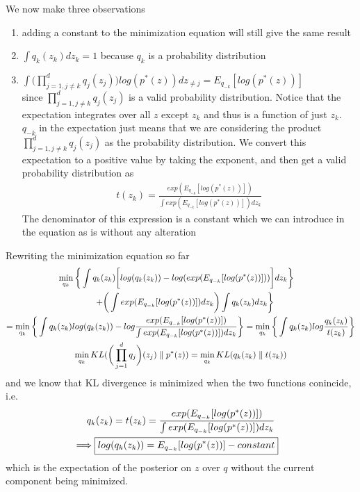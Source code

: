 \documentclass[../../statistical_learning_notes.tex]{subfiles}
\begin{document}
We now make three observations
\begin{enumerate}
    \item adding a constant to the minimization equation will still give the same result
    \item $\int q_{k}(z_{k}) dz_{k} = 1$ because $q_{k}$ is a probability distribution
    \item $\int \bigg(\prod_{j=1,j\neq k}^{d}q_{j}(z_{j})\bigg) log(p^{*}(z)) dz_{\neq j} = E_{q_{-k}}[log(p^{*}(z))]$\\
    since $\prod_{j=1,j\neq k}^{d}q_{j}(z_{j})$ is a valid probability distribution. Notice that the expectation integrates over all $z$ except $z_{k}$ and thus is a function of just $z_{k}$. $q_{-k}$ in the expectation just means that we are considering the product $\prod_{j=1,j\neq k}^{d} q_{j}(z_{j})$ as the probability distribution. We convert this expectation to a positive value by taking the exponent, and then get a valid probability distribution as
    \begin{gather*}
        t(z_{k}) = \frac{exp(E_{q_{-k}}[log(p^{*}(z))])}{\int exp(E_{q_{-k}}[log(p^{*}(z))]) dz_{k}}
    \end{gather*}
    The denominator of this expression is a constant which we can introduce in the equation as is without any alteration
\end{enumerate}

Rewriting the minimization equation so far
\begin{gather*}
    \min_{q_{k}} \bigg\{ \int q_{k}(z_{k}) \bigg[ log(q_{k}(z_{k})) - log(exp(E_{q_{-k}}[log(p^{*}(z))])) \bigg] dz_{k} \bigg\} \quad\\ \quad+ \bigg( \int exp(E_{q_{-k}}[log(p^{*}(z))]) dz_{k} \bigg) \int q_{k}(z_{k}) dz_{k} \bigg\}\\
    = \min_{q_{k}} \bigg\{ \int q_{k}(z_{k}) log(q_{k}(z_{k})) - log\frac{exp(E_{q_{-k}}[log(p^{*}(z))])}{\int exp(E_{q_{-k}}[log(p^{*}(z))]) dz_{k}} \bigg\}
    = \min_{q_{k}}\bigg\{\int q_{k}(z_{k}) log\frac{q_{k}(z_{k})}{t(z_{k})}  \bigg\}\\
    \min_{q_{k}} KL(\bigg(\prod_{j=1}^{d}q_{j} \bigg)(z_{j}) \parallel p^{*}(z)) = \min_{q_{k}} KL(q_{k}(z_{k}) \parallel t(z_{k}))\\
\end{gather*}
and we know that KL divergence is minimized when the two functions conincide, i.e.
\begin{align*}
    q_{k}(z_{k}) = t(z_{k}) = \frac{exp(E_{q_{-k}}[log(p^{*}(z))])}{\int exp(E_{q_{-k}}[log(p^{*}(z))]) dz_{k}}\\
    \implies \Aboxed{log(q_{k}(z_{k})) = E_{q_{-k}}[log(p^{*}(z))] - constant}
\end{align*}
which is the expectation of the posterior on $z$ over $q$ without the current component being minimized.
\end{document}
